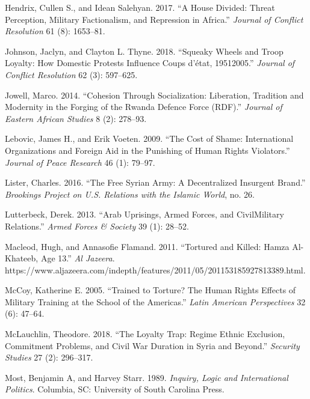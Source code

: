 \documentclass[
  12pt,
]{article}
\newlength{\cslhangindent}
\newenvironment{cslreferences}%
  {\setlength{\parindent}{0pt}%
  \everypar{\setlength{\hangindent}{\cslhangindent}}\ignorespaces}%
  {\par}
\begin{document}
\begin{cslreferences}
\leavevmode\hypertarget{ref-Hendrix2017}{}%
Hendrix, Cullen S., and Idean Salehyan. 2017. ``A House Divided: Threat Perception, Military Factionalism, and Repression in Africa.'' \emph{Journal of Conflict Resolution} 61 (8): 1653--81.

\leavevmode\hypertarget{ref-Johnson2018}{}%
Johnson, Jaclyn, and Clayton L. Thyne. 2018. ``Squeaky Wheels and Troop Loyalty: How Domestic Protests Influence Coups d'état, 19512005.'' \emph{Journal of Conflict Resolution} 62 (3): 597--625.

\leavevmode\hypertarget{ref-Jowell2014}{}%
Jowell, Marco. 2014. ``Cohesion Through Socialization: Liberation, Tradition and Modernity in the Forging of the Rwanda Defence Force (RDF).'' \emph{Journal of Eastern African Studies} 8 (2): 278--93.

\leavevmode\hypertarget{ref-Lebovic2009}{}%
Lebovic, James H., and Erik Voeten. 2009. ``The Cost of Shame: International Organizations and Foreign Aid in the Punishing of Human Rights Violators.'' \emph{Journal of Peace Research} 46 (1): 79--97.

\leavevmode\hypertarget{ref-Lister2016}{}%
Lister, Charles. 2016. ``The Free Syrian Army: A Decentralized Insurgent Brand.'' \emph{Brookings Project on U.S. Relations with the Islamic World}, no. 26.

\leavevmode\hypertarget{ref-Lutterbeck2013}{}%
Lutterbeck, Derek. 2013. ``Arab Uprisings, Armed Forces, and CivilMilitary Relations.'' \emph{Armed Forces \& Society} 39 (1): 28--52.

\leavevmode\hypertarget{ref-Macleod2011}{}%
Macleod, Hugh, and Annasofie Flamand. 2011. ``Tortured and Killed: Hamza Al-Khateeb, Age 13.'' \emph{Al Jazeera}. https://www.aljazeera.com/indepth/features/2011/05/201153185927813389.html.

\leavevmode\hypertarget{ref-McCoy2005a}{}%
McCoy, Katherine E. 2005. ``Trained to Torture? The Human Rights Effects of Military Training at the School of the Americas.'' \emph{Latin American Perspectives} 32 (6): 47--64.

\leavevmode\hypertarget{ref-McLauchlin2018}{}%
McLauchlin, Theodore. 2018. ``The Loyalty Trap: Regime Ethnic Exclusion, Commitment Problems, and Civil War Duration in Syria and Beyond.'' \emph{Security Studies} 27 (2): 296--317.

\leavevmode\hypertarget{ref-Most1989}{}%
Most, Benjamin A, and Harvey Starr. 1989. \emph{Inquiry, Logic and International Politics}. Columbia, SC: University of South Carolina Press.


\end{cslreferences}
\end{document}
